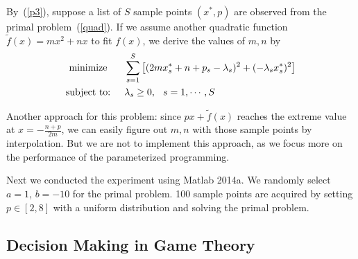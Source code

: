 By~(\ref{p3}), suppose a list of $S$ sample points $(x^*,p)$ are observed from the primal problem~(\ref{quad}). If we assume another quadratic function $\tilde{f}(x)=mx^2+nx$ to fit $f(x)$, we derive the values of $m,n$ by
\begin{align*}
\begin{split}
\textrm{minimize }\hspace{.2in}&\sum_{s=1}^S\left[(2mx_s^*+n+p_s-\lambda_s)^2+(-\lambda_s x_s^*)^2\right]\\
\textrm{subject to:}\hspace{.2in}&\lambda_s\ge0,\hspace{.1in}s=1,\cdots,S
\end{split}
\end{align*}

Another approach for this problem: since $px+\tilde{f}(x)$ reaches the extreme value at $x=-\frac{n+p}{2m}$, we can easily figure out $m,n$ with those sample points by interpolation. But we are not to implement this approach, as we focus more on the performance of the parameterized programming.

Next we conducted the experiment using Matlab 2014a. We randomly select $a=1$, $b=-10$ for the primal problem. 100 sample points are acquired by setting $p\in[2,8]$ with a uniform distribution and solving the primal problem.

\subsection{Decision Making in Game Theory}

